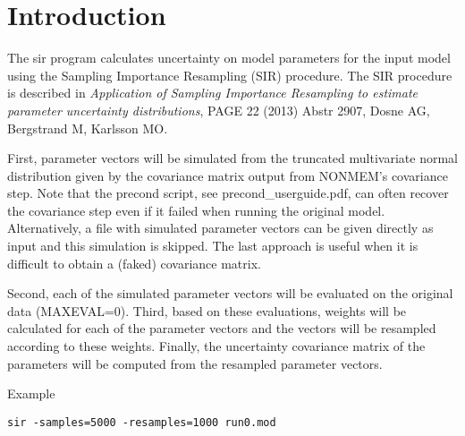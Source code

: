 



\maketitle


\section{Introduction}
The sir program calculates uncertainty
on model parameters for the input model using the Sampling Importance Resampling (SIR) procedure.
The SIR procedure is described in
\emph{Application of Sampling Importance Resampling to estimate parameter uncertainty distributions}, 
PAGE 22 (2013) Abstr 2907, Dosne AG, Bergstrand M, Karlsson MO. 

First, parameter vectors will be simulated from the truncated multivariate normal distribution 
given by the covariance matrix output from NONMEM's covariance step.
Note that the precond script, see precond\_userguide.pdf, can often recover the covariance step
even if it failed when running the original model.
Alternatively, a file with simulated parameter vectors can be given directly as input and this simulation is skipped. The last approach is useful when it is
difficult to obtain a (faked) covariance matrix.

Second, each of the simulated parameter vectors will be evaluated on the original data (MAXEVAL=0).
Third, based on these evaluations, weights will be calculated for each of the parameter vectors and the vectors 
will be resampled according to these weights. Finally, the uncertainty covariance matrix of the parameters 
will be computed from the resampled parameter vectors.

Example
\begin{verbatim}
sir -samples=5000 -resamples=1000 run0.mod
\end{verbatim}

